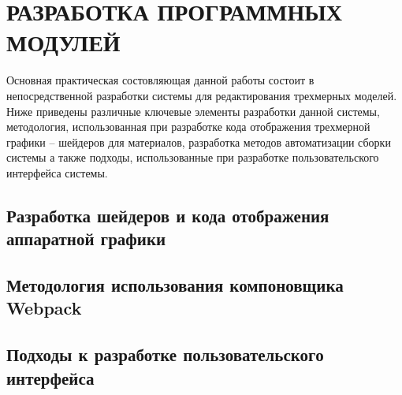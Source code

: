 \section{РАЗРАБОТКА ПРОГРАММНЫХ МОДУЛЕЙ}
\label{sec:dev}

Основная практическая состовляющая данной работы состоит в непосредственной разработки системы для редактирования трехмерных моделей. Ниже приведены различные ключевые элементы
разработки данной системы, методология, использованная при разработке кода отображения трехмерной графики -- шейдеров для материалов, разработка методов автоматизации сборки
системы а также подходы, использованные при разработке пользовательского интерфейса системы.

\subsection{Разработка шейдеров и кода отображения аппаратной графики}
\label{sub:dev:shader}


\subsection{Методология использования компоновщика Webpack}
\label{sub:dev:webpack}


\subsection{Подходы к разработке пользовательского интерфейса}
\label{sub:dev:react}

